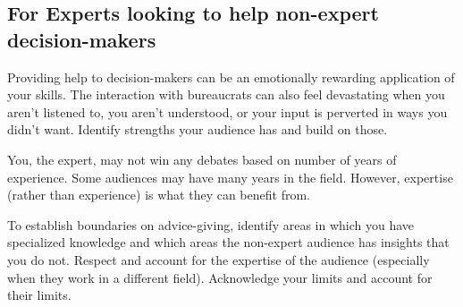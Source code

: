 



\subsection*{For Experts looking to help non-expert decision-makers}

Providing help to decision-makers can be an emotionally rewarding application of your skills. The interaction with bureaucrats can also feel devastating when you aren't listened to, you aren't understood, or your input is perverted in ways you didn't want. %
Identify strengths your audience has and build on those.








You, the expert, may not win any debates based on number of years of experience. Some audiences may have many years in the field. However, expertise (rather than experience) is what they can benefit from. 

To establish boundaries on advice-giving, identify areas in which you have specialized knowledge and which areas  the non-expert audience has insights that you do not.
Respect and account for the expertise of the audience (especially when they work in a different field). Acknowledge your  limits and account for their limits.

